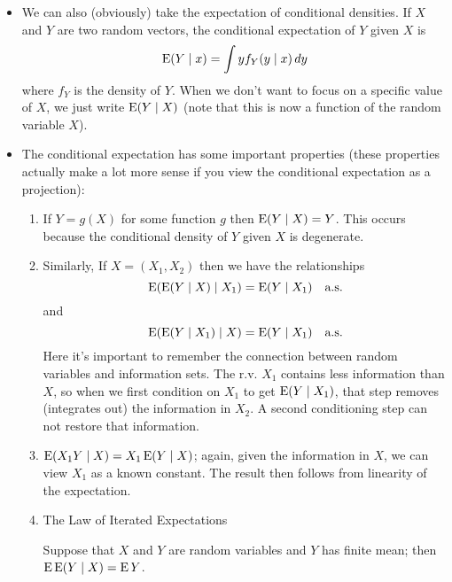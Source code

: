 \begin{itemize}

\item We can also (obviously) take the expectation of conditional
  densities.  If $X$ and $Y$ are two random vectors, the conditional
  expectation of $Y$ given $X$ is
  \begin{equation*}
    \operatorname{E}(Y \mid x) = \int y f_Y(y \mid x) \,dy
  \end{equation*}
  where $f_Y$ is the density of $Y$.  When we don't want to focus on a specific
  value of $X$, we just write $\operatorname{E}(Y \mid X)$ (note that this is now a
  function of the random variable $X$).

\item The conditional expectation has some important properties (these
  properties actually make a lot more sense if you view the
  conditional expectation as a projection):
  \begin{enumerate}
  \item If $Y = g(X)$ for some function $g$ then $\operatorname{E}(Y \mid X) = Y$.
    This occurs because the conditional density of $Y$ given $X$ is
    degenerate.
  \item Similarly, If $X = (X_1, X_2)$ then we have the relationships
    \begin{equation*}
      \operatorname{E}(\operatorname{E}(Y \mid X) \mid X_1) = \operatorname{E}(Y \mid X_1) \quad\text{a.s.}
    \end{equation*}
    and
    \begin{equation*}
      \operatorname{E}(\operatorname{E}(Y \mid X_1) \mid X) = \operatorname{E}(Y \mid X_1) \quad\text{a.s.}
    \end{equation*}
    Here it's important to remember the connection between random
    variables and information sets.  The r.v. $X_1$ contains less
    information than $X$, so when we first condition on $X_1$ to get
    $\operatorname{E}(Y \mid X_1)$, that step removes (integrates out) the information
    in $X_2$.  A second conditioning step can not restore that
    information.
  \item $\operatorname{E}(X_1 Y \mid X) = X_1 \operatorname{E}(Y \mid X)$; again, given the information in
    $X$, we can view $X_1$ as a known constant.  The result then
    follows from linearity of the expectation.
  \item The Law of Iterated Expectations
    \begin{thm}
      Suppose that $X$ and $Y$ are random variables and $Y$ has finite
      mean; then $\operatorname{E} \operatorname{E}(Y \mid X) = \operatorname{E} Y$.

\end{thm}
\end{enumerate}
\end{itemize}
